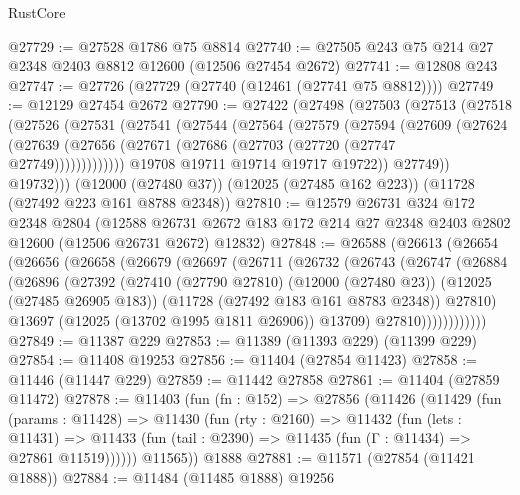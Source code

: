 \begin{lexlean}{RustCore}
\begin{coremodule}
@27729 := @27528 @1786 @75 @8814
@27740 := @27505 @243 @75 @214 @27 @2348 @2403 @8812 @12600 (@12506 @27454 @2672)
@27741 := @12808 @243
@27747 := @27726 (@27729 (@27740 (@12461 (@27741 @75 @8812))))
@27749 := @12129 @27454 @2672
@27790 := @27422
    (@27498
      (@27503
        (@27513
          (@27518
            (@27526
              (@27531
                (@27541
                  (@27544
                    (@27564
                      (@27579
                        (@27594
                          (@27609
                            (@27624
                              (@27639
                                (@27656 (@27671 (@27686 (@27703 (@27720 (@27747 @27749)))))))))))))
                  @19708
                  @19711
                  @19714
                  @19717
                  @19722))
              @27749))
          @19732)))
    (@12000 (@27480 @37))
    (@12025 (@27485 @162 @223))
    (@11728 (@27492 @223 @161 @8788 @2348))
@27810 := @12579
    @26731
    @324
    @172
    @2348
    @2804
    (@12588 @26731 @2672 @183 @172 @214 @27 @2348 @2403 @2802 @12600 (@12506 @26731 @2672) @12832)
@27848 := @26588
    (@26613
      (@26654
        (@26656
          (@26658
            (@26679
              (@26697
                (@26711
                  (@26732
                    (@26743
                      (@26747
                        (@26884
                          (@26896
                            (@27392
                              (@27410
                                (@27790 @27810)
                                (@12000 (@27480 @23))
                                (@12025 (@27485 @26905 @183))
                                (@11728 (@27492 @183 @161 @8783 @2348))
                                @27810)
                              @13697
                              (@12025 (@13702 @1995 @1811 @26906))
                              @13709)
                            @27810))))))))))))
@27849 := @11387 @229
@27853 := @11389 (@11393 @229) (@11399 @229)
@27854 := @11408 @19253
@27856 := @11404 (@27854 @11423)
@27858 := @11446 (@11447 @229)
@27859 := @11442 @27858
@27861 := @11404 (@27859 @11472)
@27878 := @11403
    (fun (fn : @152) =>
    @27856
      (@11426
        (@11429
          (fun (params : @11428) =>
          @11430
            (fun (rty : @2160) =>
            @11432
              (fun (lets : @11431) =>
              @11433 (fun (tail : @2390) => @11435 (fun (Γ : @11434) => @27861 @11519))))))
        @11565))
    @1888
@27881 := @11571 (@27854 (@11421 @1888))
@27884 := @11484 (@11485 @1888) @19256

\end{coremodule}
\end{lexlean}
